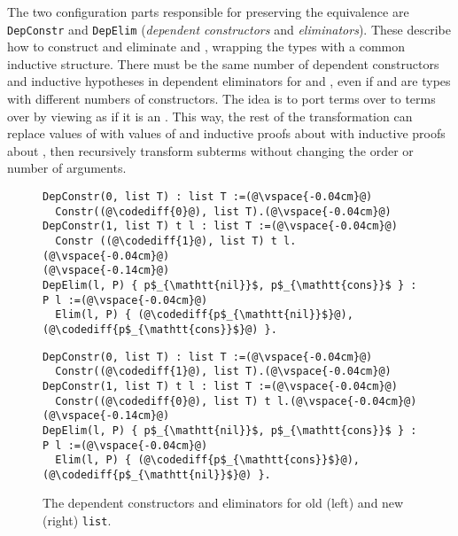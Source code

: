 The two configuration parts responsible for preserving the
equivalence are \lstinline{DepConstr}
and \lstinline{DepElim} (\textit{dependent constructors} and \textit{eliminators}).
These describe how to construct and eliminate \A and \B, wrapping the types with a common inductive structure.
There must be the same number of dependent constructors and inductive hypotheses in dependent eliminators for \A and \B,
even if \A and \B are types with different numbers of constructors.
The idea is to port terms over \A to terms over \B by viewing \B as if it is an \A.
This way, the rest of the transformation can replace values of \A with values of \B and
inductive proofs about \A with inductive proofs about \B, then recursively transform
subterms without changing the order or number of arguments.

\begin{figure}
\begin{minipage}{0.48\textwidth}
\begin{lstlisting}
DepConstr(0, list T) : list T :=(@\vspace{-0.04cm}@)
  Constr((@\codediff{0}@), list T).(@\vspace{-0.04cm}@)
DepConstr(1, list T) t l : list T :=(@\vspace{-0.04cm}@)
  Constr ((@\codediff{1}@), list T) t l.(@\vspace{-0.04cm}@)
(@\vspace{-0.14cm}@)
DepElim(l, P) { p$_{\mathtt{nil}}$, p$_{\mathtt{cons}}$ } : P l :=(@\vspace{-0.04cm}@)
  Elim(l, P) { (@\codediff{p$_{\mathtt{nil}}$}@), (@\codediff{p$_{\mathtt{cons}}$}@) }.
\end{lstlisting}
\end{minipage}
\hfill
\begin{minipage}{0.48\textwidth}
\begin{lstlisting}
DepConstr(0, list T) : list T :=(@\vspace{-0.04cm}@)
  Constr((@\codediff{1}@), list T).(@\vspace{-0.04cm}@)
DepConstr(1, list T) t l : list T :=(@\vspace{-0.04cm}@)
  Constr((@\codediff{0}@), list T) t l.(@\vspace{-0.04cm}@)
(@\vspace{-0.14cm}@)
DepElim(l, P) { p$_{\mathtt{nil}}$, p$_{\mathtt{cons}}$ } : P l :=(@\vspace{-0.04cm}@)
  Elim(l, P) { (@\codediff{p$_{\mathtt{cons}}$}@), (@\codediff{p$_{\mathtt{nil}}$}@) }.
\end{lstlisting}
\end{minipage}
\vspace{-0.3cm}
\caption{The dependent constructors and eliminators for old (left) and new (right) \lstinline{list}.}
\label{fig:listconfig}
\end{figure}

